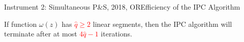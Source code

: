 \documentclass[14pt]{beamer}
\begin{document}
\begin{frame}{Instrument 2: Simultaneous P\&S, {\footnotesize 2018, OR}}{Efficiency of the IPC Algorithm}
\vspace{-6pt}
\small
\begin{theorem}
\rm
\justifying
	If function $\omega(z)$ has \textcolor{red}{$\hat{q}\geq 2$} linear segments, then the IPC algorithm will terminate after at most \textcolor{red}{$4\hat{q}-1$} iterations.
\end{theorem}
\vspace{-11pt}
\begin{figure}
\end{figure}
\vspace{-20pt}
\end{frame}
\end{document}
